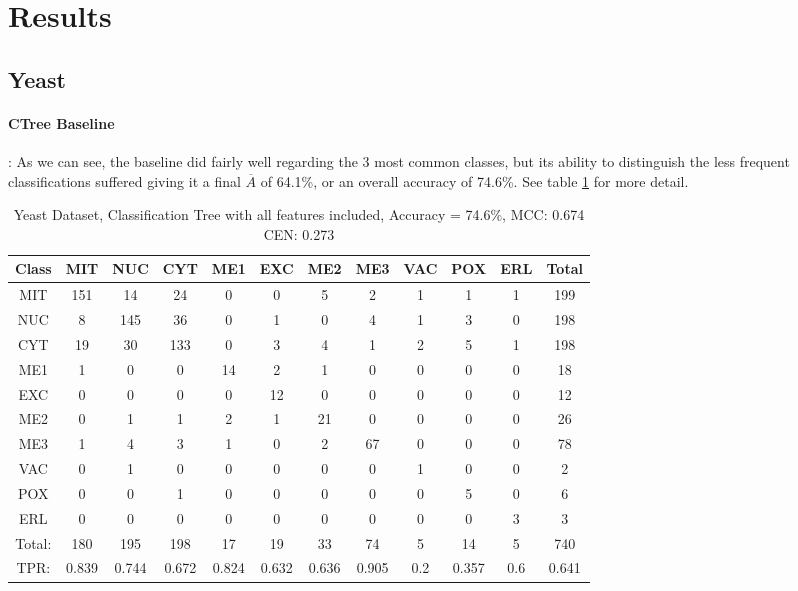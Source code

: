 \section{Results}
\subsection{Yeast}

\paragraph{CTree Baseline}:
As we can see, the baseline did fairly well regarding the 3 most common classes, but its ability to distinguish the less frequent classifications suffered giving it a final $\overline{A}$ of 64.1\%, or an overall accuracy of 74.6\%. See table \ref{tab:yeastctreebase} for more detail.\\
\begin{table}[h!]
\begin{tabular}{|c|c|c|c|c|c|c|c|c|c|c|c|}
\hline
Class&MIT&NUC&CYT&ME1&EXC&ME2&ME3&VAC&POX&ERL&Total
\\\hline
MIT&151&14&24&0&0&5&2&1&1&1&199\\
NUC&8&145&36&0&1&0&4&1&3&0&198\\
CYT&19&30&133&0&3&4&1&2&5&1&198\\
ME1&1&0&0&14&2&1&0&0&0&0&18\\
EXC&0&0&0&0&12&0&0&0&0&0&12\\
ME2&0&1&1&2&1&21&0&0&0&0&26\\
ME3&1&4&3&1&0&2&67&0&0&0&78\\
VAC&0&1&0&0&0&0&0&1&0&0&2\\
POX&0&0&1&0&0&0&0&0&5&0&6\\
ERL&0&0&0&0&0&0&0&0&0&3&3\\
\hline
Total:&180&195&198&17&19&33&74&5&14&5&740\\
TPR:&0.839&0.744&0.672&0.824&0.632&0.636&0.905&0.2&0.357&0.6&0.641\\
\hline
\end{tabular}
\caption[Yeast: Classification Tree without Feature Selection Confusion Matrix]{Yeast Dataset, Classification Tree with all features included, Accuracy = 74.6\%, MCC: 0.674 CEN: 0.273}
\label{tab:yeastctreebase}
\end{table}

